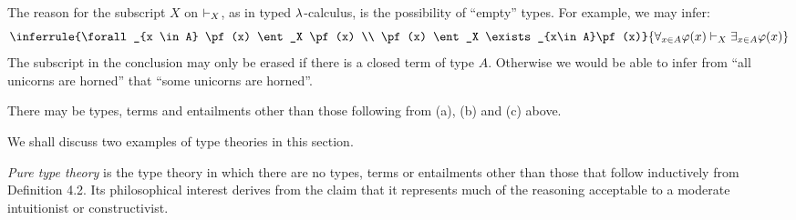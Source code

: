 \begin{defn}
\begin{enumerate}
The reason for the subscript $X$ on $\vdash_X$, as in typed $\lambda$-calculus, is the
possibility of ``empty'' types. For example, we may infer:
\[
\inferrule
	{\forall_{x \in A} \pf(x) \ent_X \pf(x) \\ \pf(x) \ent_X \exists_{x\in A}\pf(x)}
	{\forall_{x \in A} \pf(x)  \ent_X \exists_{x\in A}\pf(x)}
\]
The subscript in the conclusion may only be erased if there is a closed term
of type $A$. Otherwise we would be able to infer from ``all unicorns are horned''
that ``some unicorns are horned''.
\end{enumerate}
\end{defn}
\noindent 
There may be types, terms and entailments other than those following from
(a), (b) and (c) above.

We shall discuss two examples of type theories in this section.

\begin{example}
{\em Pure type theory} is the type theory in which there are no
types, terms or entailments other than those that follow inductively from
Definition 4.2. Its philosophical interest derives from the claim that it
represents much of the reasoning acceptable to a moderate intuitionist or
constructivist.
\end{example}

